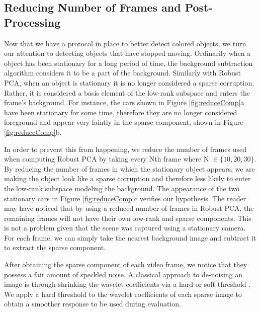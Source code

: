 \documentclass{article}
\begin{document}
\subsection{Reducing Number of Frames and Post-Processing}

Now that we have a protocol in place to better detect colored objects, we turn our attention to detecting objects that have stopped moving. Ordinarily when a object has been stationary for a long period of time, the background subtraction algorithm considers it  to be a part of the background. Similarly with  Robust PCA, when an object is stationary it is no longer considered a sparse corruption. Rather, it is considered a basis element of the low-rank subspace and enters the frame's background. For instance, the cars shown in Figure \ref{fig:reduceComp}a have been stationary for some time, therefore they are no longer considered foreground and appear very faintly in the sparse component, shown in Figure \ref{fig:reduceComp}b.
 
In order to prevent this from happening, we reduce the number of frames used when computing Robust PCA by taking every Nth frame where N $\in \{ 10, 20, 30\}$. By reducing the number of frames in which the stationary object appears, we are making the object look like a sparse corruption and therefore less likely to enter the low-rank subspace modeling the background. The appearance of the two stationary cars in Figure \ref{fig:reduceComp}c verifies our hypothesis. The reader may have noticed that by using a reduced number of frames in Robust PCA, the remaining frames will not have their own low-rank and sparse components. This is not a problem given that the scene was captured using a stationary camera. For each frame, we can simply take the nearest background image and subtract it to extract the sparse component.

After obtaining the sparse component of each video frame, we notice that they possess a fair amount of speckled noise. A classical approach to de-noising an image is through shrinking the wavelet coefficients via a hard or soft threshold \cite{Donoho95}. We apply a hard threshold to the wavelet coefficients of each sparse image to obtain a smoother response to be used during evaluation.
\end{document}
